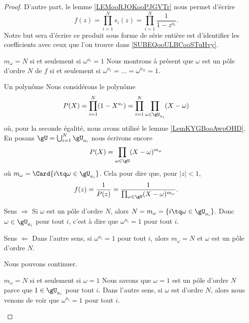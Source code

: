 \begin{proof}
    D'autre part, le lemme \ref{LEMooRJOKooPJGVTr} nous permet d'écrire
    \begin{equation}
        f(z)=\prod_{i=1}^Ns_i(z)=\prod_{i=1}^N\frac{1}{ 1-z^{a_i} }.
    \end{equation}
    Notre but sera d'écrire ce produit sous forme de série entière est d'identifier les coefficients avec ceux que l'on trouve dans \eqref{SUBEQooULBCooSTuHvy}.

    \begin{subproof}
    \item[\( m_{\omega}=N\) si et seulement si \( \omega^{a_i}=1\)]
    Nous montrons à présent que \( \omega\) est un pôle d'ordre \( N\) de \( f\) si et seulement si \( \omega^{a_1}=\ldots=\omega^{a_N}=1\).
    \begin{subproof}
    \item[Un polynôme]
        Nous considérons le polynôme
        \begin{equation}
            P(X)=\prod_{i=1}^N(1-X^{a_i})=\prod_{i=1}^N\prod_{\omega\in \gU_{a_i}}(X-\omega)
        \end{equation}
        où, pour la seconde égalité, nous avons utilisé le lemme \ref{LemKYGBooAwpOHD}. En posans \( \gU=\bigcup_{i=1}^N\gU_{a_i}\) nous écrivons encore
        \begin{equation}
            P(X)=\prod_{\omega\in \gU}(X-\omega)^{m_{\omega}}
        \end{equation}
        où \( m_{\omega}=\Card\{ i\tq \omega\in \gU_{a_i} \}\). Cela pour dire que, pour \( | z |<1\),
        \begin{equation}
            f(z)=\frac{1}{ P(z) }=\frac{1}{ \prod_{\omega\in \gU} (X-\omega)^{m_{\omega}}}.
        \end{equation}
    \item[Sens \( \Rightarrow\)]
        Si \( \omega\) est un pôle d'ordre \( N\), alors \( N=m_{\omega}=\{ i\tq \omega\in \gU_{a_i} \}\). Donc \( \omega\in \gU_{a_i}\) pour tout \( i\), c'est à dire que \( \omega^{a_i}=1\) pour tout \( i\).
    \item[Sens \( \Leftarrow\)]
        Dans l'autre sens, si \( \omega^{a_i}=1\) pour tout \( i\), alors \( m_{\omega}=N\) et \( \omega\) est un pôle d'ordre \( N\).
    \end{subproof}

    Nous pouvons continuer.
    \item[\( m_{\omega}=N\) si et seulement si \( \omega=1\)]
        Nous savons que \( \omega=1\) est un pôle d'ordre \( N\) parce que \( 1\in \gU_{a_i}\) pour tout \( i\). Dans l'autre sens, si \( \omega\) est d'ordre \( N\), alors nous venons de voir que \( \omega^{a_i}=1\) pour tout \( i\).


\end{subproof}
\end{proof}
